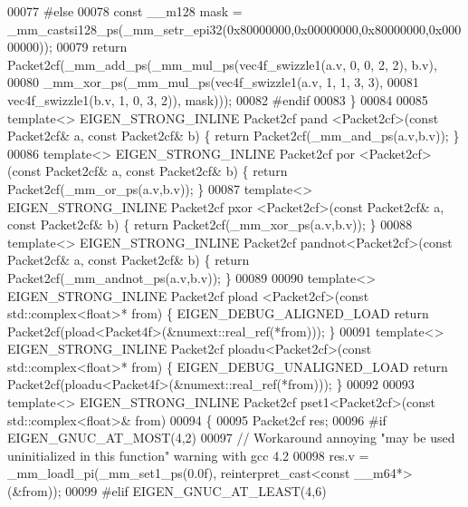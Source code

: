 \begin{DoxyCode}
00077 \textcolor{preprocessor}{  #else}
00078   \textcolor{keyword}{const} \_\_m128 mask = \_mm\_castsi128\_ps(\_mm\_setr\_epi32(0x80000000,0x00000000,0x80000000,0x00000000));
00079   \textcolor{keywordflow}{return} Packet2cf(\_mm\_add\_ps(\_mm\_mul\_ps(vec4f\_swizzle1(a.v, 0, 0, 2, 2), b.v),
00080                               \_mm\_xor\_ps(\_mm\_mul\_ps(vec4f\_swizzle1(a.v, 1, 1, 3, 3),
00081                                                     vec4f\_swizzle1(b.v, 1, 0, 3, 2)), mask)));
00082 \textcolor{preprocessor}{  #endif}
00083 \}
00084 
00085 \textcolor{keyword}{template}<> EIGEN\_STRONG\_INLINE Packet2cf pand   <Packet2cf>(\textcolor{keyword}{const} Packet2cf& a, \textcolor{keyword}{const} Packet2cf& b) \{ \textcolor{keywordflow}{
      return} Packet2cf(\_mm\_and\_ps(a.v,b.v)); \}
00086 \textcolor{keyword}{template}<> EIGEN\_STRONG\_INLINE Packet2cf por    <Packet2cf>(\textcolor{keyword}{const} Packet2cf& a, \textcolor{keyword}{const} Packet2cf& b) \{ \textcolor{keywordflow}{
      return} Packet2cf(\_mm\_or\_ps(a.v,b.v)); \}
00087 \textcolor{keyword}{template}<> EIGEN\_STRONG\_INLINE Packet2cf pxor   <Packet2cf>(\textcolor{keyword}{const} Packet2cf& a, \textcolor{keyword}{const} Packet2cf& b) \{ \textcolor{keywordflow}{
      return} Packet2cf(\_mm\_xor\_ps(a.v,b.v)); \}
00088 \textcolor{keyword}{template}<> EIGEN\_STRONG\_INLINE Packet2cf pandnot<Packet2cf>(\textcolor{keyword}{const} Packet2cf& a, \textcolor{keyword}{const} Packet2cf& b) \{ \textcolor{keywordflow}{
      return} Packet2cf(\_mm\_andnot\_ps(a.v,b.v)); \}
00089 
00090 \textcolor{keyword}{template}<> EIGEN\_STRONG\_INLINE Packet2cf pload <Packet2cf>(\textcolor{keyword}{const} std::complex<float>* from) \{ 
      EIGEN\_DEBUG\_ALIGNED\_LOAD \textcolor{keywordflow}{return} Packet2cf(pload<Packet4f>(&numext::real\_ref(*from))); \}
00091 \textcolor{keyword}{template}<> EIGEN\_STRONG\_INLINE Packet2cf ploadu<Packet2cf>(\textcolor{keyword}{const} std::complex<float>* from) \{ 
      EIGEN\_DEBUG\_UNALIGNED\_LOAD \textcolor{keywordflow}{return} Packet2cf(ploadu<Packet4f>(&numext::real\_ref(*from))); \}
00092 
00093 \textcolor{keyword}{template}<> EIGEN\_STRONG\_INLINE Packet2cf pset1<Packet2cf>(\textcolor{keyword}{const} std::complex<float>&  from)
00094 \{
00095   Packet2cf res;
00096 \textcolor{preprocessor}{#if EIGEN\_GNUC\_AT\_MOST(4,2)}
00097   \textcolor{comment}{// Workaround annoying "may be used uninitialized in this function" warning with gcc 4.2}
00098   res.v = \_mm\_loadl\_pi(\_mm\_set1\_ps(0.0f), reinterpret\_cast<const \_\_m64*>(&from));
00099 \textcolor{preprocessor}{#elif EIGEN\_GNUC\_AT\_LEAST(4,6)}

\end{DoxyCode}
